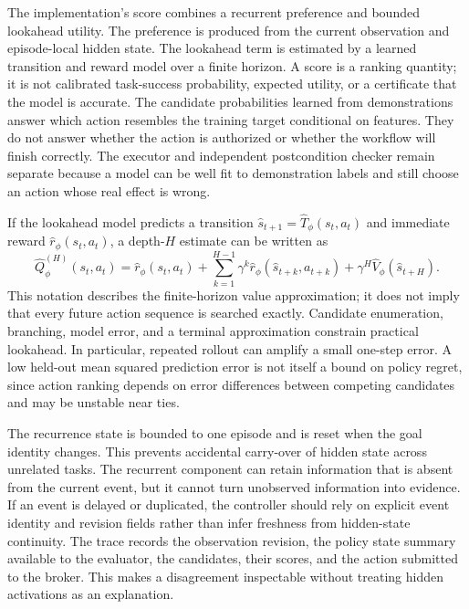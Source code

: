 \documentclass[11pt]{article}
\begin{document}
The implementation's score combines a recurrent preference and bounded lookahead utility. The preference is produced from the current observation and episode-local hidden state. The lookahead term is estimated by a learned transition and reward model over a finite horizon. A score is a ranking quantity; it is not calibrated task-success probability, expected utility, or a certificate that the model is accurate. The candidate probabilities learned from demonstrations answer which action resembles the training target conditional on features. They do not answer whether the action is authorized or whether the workflow will finish correctly. The executor and independent postcondition checker remain separate because a model can be well fit to demonstration labels and still choose an action whose real effect is wrong.

If the lookahead model predicts a transition $\hat{s}_{t+1}=\hat{T}_\phi(s_t,a_t)$ and immediate reward $\hat{r}_\phi(s_t,a_t)$, a depth-$H$ estimate can be written as
\begin{equation}
\hat{Q}^{(H)}_\phi(s_t,a_t)=\hat{r}_\phi(s_t,a_t)+\sum_{k=1}^{H-1}\gamma^k\hat{r}_\phi(\hat{s}_{t+k},a_{t+k})+\gamma^H\hat{V}_\phi(\hat{s}_{t+H}).
\end{equation}
This notation describes the finite-horizon value approximation; it does not imply that every future action sequence is searched exactly. Candidate enumeration, branching, model error, and a terminal approximation constrain practical lookahead. In particular, repeated rollout can amplify a small one-step error. A low held-out mean squared prediction error is not itself a bound on policy regret, since action ranking depends on error differences between competing candidates and may be unstable near ties.

The recurrence state is bounded to one episode and is reset when the goal identity changes. This prevents accidental carry-over of hidden state across unrelated tasks. The recurrent component can retain information that is absent from the current event, but it cannot turn unobserved information into evidence. If an event is delayed or duplicated, the controller should rely on explicit event identity and revision fields rather than infer freshness from hidden-state continuity. The trace records the observation revision, the policy state summary available to the evaluator, the candidates, their scores, and the action submitted to the broker. This makes a disagreement inspectable without treating hidden activations as an explanation.
\end{document}
